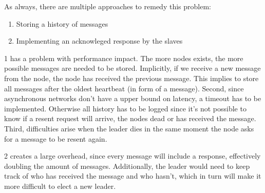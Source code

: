 \documentclass[a4paper, 11pt]{article}
\begin{document}
As always, there are multiple approaches to remedy this problem:
\begin{enumerate}
    \item Storing a history of messages
    \item Implementing an acknowleged response by the slaves
\end{enumerate}
1 has a problem with performance impact. The more nodes exists, the more possible messages are needed to be stored.
Implicitly, if we receive a new message from the node, the node has received the previous message.
This implies to store all messages after the oldest heartbeat (in form of a message).
Second, since asynchronous networks don't have a upper bound on latency, a timeout has to be implemented.
Otherwise all history has to be logged since it's not possible to know if a resent request will arrive, the nodes dead or has received the message.
Third, difficulties arise when the leader dies in the same moment the node asks for a message to be resent again.

2 creates a large overhead, since every message will include a response, effectively doubling the amount of messages.
Additionally, the leader would need to keep track of who has received the message and who hasn't, which in turn will make it more difficult to elect a new leader.
\end{document}
